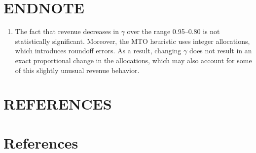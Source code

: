 \section{ENDNOTE}\label{endnote}

\begin{enumerate}
\def\labelenumi{\arabic{enumi}.}
\item The fact that revenue decreases in \(\gamma\) over the range 0.95–0.80 is not statistically significant. Moreover, the MTO heuristic uses integer allocations, which introduces roundoff errors. As a result, changing \(\gamma\) does not result in an exact proportional change in the allocations, which may also account for some of this slightly unusual revenue behavior.
\end{enumerate}

\section{REFERENCES}\label{references}

\section*{References}

